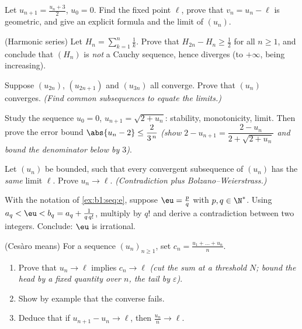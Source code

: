 \begin{exercise}[$\star$]\label{exo:b1:seq:4}
Let $u_{n+1} = \frac{u_n + 3}{2}$, $u_0 = 0$. Find the fixed point
$\ell$, prove that $v_n = u_n - \ell$ is geometric, and give an
explicit formula and the limit of $(u_n)$.
\end{exercise}

\begin{exercise}[$\star\star$]\label{exo:b1:seq:5}
(Harmonic series) Let $H_n = \sum_{k=1}^{n} \frac 1k$. Prove that
$H_{2n} - H_n \geq \frac12$ for all $n \geq 1$, and conclude that
$(H_n)$ is \emph{not} a Cauchy sequence, hence diverges (to
$+\infty$, being increasing).
\end{exercise}

\begin{exercise}[$\star\star$]\label{exo:b1:seq:6}
Suppose $(u_{2n})$, $(u_{2n+1})$ and $(u_{3n})$ all converge. Prove
that $(u_n)$ converges. \emph{(Find common subsequences to equate the
limits.)}
\end{exercise}

\begin{exercise}[$\star\star$]\label{exo:b1:seq:7}
Study the sequence $u_0 = 0$, $u_{n+1} = \sqrt{2 + u_n}$:
stability, monotonicity, limit. Then prove the error bound
$\abs{u_n - 2} \leq \dfrac{2}{3^{\,n}}$ \emph{(show $2 - u_{n+1} =
\dfrac{2 - u_n}{2 + \sqrt{2 + u_n}}$ and bound the denominator below
by $3$)}.
\end{exercise}

\begin{exercise}[$\star\star$]\label{exo:b1:seq:8}
Let $(u_n)$ be bounded, such that every convergent subsequence of
$(u_n)$ has the \emph{same} limit $\ell$. Prove $u_n \to \ell$.
\emph{(Contradiction plus Bolzano--Weierstrass.)}
\end{exercise}

\begin{exercise}[$\star\star\star$]\label{exo:b1:seq:9}
With the notation of \cref{ex:b1:seq:e}, suppose $\eu = \frac pq$
with $p, q \in \N^*$. Using $a_q < \eu < b_q = a_q + \frac{1}{q\,
q!}$, multiply by $q!$ and derive a contradiction between two
integers. Conclude: $\eu$ is irrational.
\end{exercise}

\begin{exercise}[$\star\star\star$]\label{exo:b1:seq:10}
(Ces\`aro means) For a sequence $(u_n)_{n \geq 1}$, set $c_n =
\frac{u_1 + \dots + u_n}{n}$.
\begin{enumerate}
  \item Prove that $u_n \to \ell$ implies $c_n \to \ell$ \emph{(cut
        the sum at a threshold $N$; bound the head by a fixed
        quantity over $n$, the tail by $\varepsilon$)}.
  \item Show by example that the converse fails.
  \item Deduce that if $u_{n+1} - u_n \to \ell$, then $\frac{u_n}{n}
        \to \ell$.
\end{enumerate}
\end{exercise}

